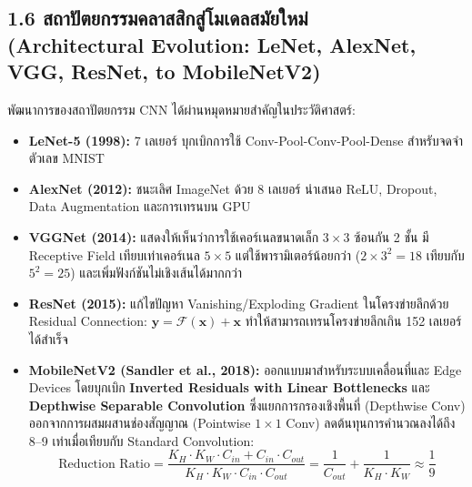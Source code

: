 \documentclass[12pt,a4paper]{article}
\begin{document}
\clearpage
\subsection*{1.6 สถาปัตยกรรมคลาสสิกสู่โมเดลสมัยใหม่\\ \normalsize(Architectural Evolution: LeNet, AlexNet, VGG, ResNet, to MobileNetV2)}
พัฒนาการของสถาปัตยกรรม CNN ได้ผ่านหมุดหมายสำคัญในประวัติศาสตร์:
\begin{itemize}[leftmargin=1.8em, itemsep=1pt]
    \item \textbf{LeNet-5 (1998):} 7 เลเยอร์ บุกเบิกการใช้ Conv-Pool-Conv-Pool-Dense สำหรับจดจำตัวเลข MNIST
    \item \textbf{AlexNet (2012):} ชนะเลิศ ImageNet ด้วย 8 เลเยอร์ นำเสนอ ReLU, Dropout, Data Augmentation และการเทรนบน GPU
    \item \textbf{VGGNet (2014):} แสดงให้เห็นว่าการใช้เคอร์เนลขนาดเล็ก $3 \times 3$ ซ้อนกัน 2 ชั้น มี Receptive Field เทียบเท่าเคอร์เนล $5 \times 5$ แต่ใช้พารามิเตอร์น้อยกว่า ($2 \times 3^2 = 18$ เทียบกับ $5^2 = 25$) และเพิ่มฟังก์ชันไม่เชิงเส้นได้มากกว่า
    \item \textbf{ResNet (2015):} แก้ไขปัญหา Vanishing/Exploding Gradient ในโครงข่ายลึกด้วย Residual Connection: $\mathbf{y} = \mathcal{F}(\mathbf{x}) + \mathbf{x}$ ทำให้สามารถเทรนโครงข่ายลึกเกิน 152 เลเยอร์ได้สำเร็จ
    \item \textbf{MobileNetV2 (Sandler et al., 2018):} ออกแบบมาสำหรับระบบเคลื่อนที่และ Edge Devices โดยบุกเบิก \textbf{Inverted Residuals with Linear Bottlenecks} และ \textbf{Depthwise Separable Convolution} ซึ่งแยกการกรองเชิงพื้นที่ (Depthwise Conv) ออกจากการผสมผสานช่องสัญญาณ (Pointwise $1 \times 1$ Conv) ลดต้นทุนการคำนวณลงได้ถึง 8--9 เท่าเมื่อเทียบกับ Standard Convolution:
    \begin{equation}
        \text{Reduction Ratio} = \frac{K_H \cdot K_W \cdot C_{in} + C_{in} \cdot C_{out}}{K_H \cdot K_W \cdot C_{in} \cdot C_{out}} = \frac{1}{C_{out}} + \frac{1}{K_H \cdot K_W} \approx \frac{1}{9}
    \end{equation}
\end{itemize}
\end{document}
